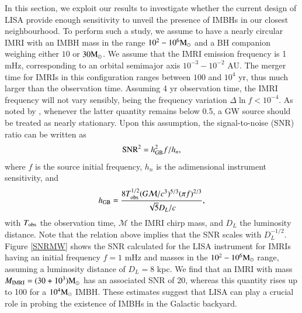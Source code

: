\documentclass[article]{aa}
\newcommand{\Ms}{{\rm M}_\odot}
\newcommand{\imri}{{\rm IMRI}}
\begin{document}
In this section, we exploit our results to investigate whether the current design of LISA provide enough sensitivity to unveil the presence of IMBHs in our closest neighbourhood. 
To perform such a study, we assume to have a nearly circular IMRI with an IMBH mass in the range $10^2-10^6\Ms$ and a BH companion weighing either $10$ or $30\Ms$. 
We assume that the IMRI emission frequency is 1 mHz, corresponding to an orbital semimajor axis $10^{-3}-10^{-2}$ AU. 
The merger time for IMRIs in this configuration ranges between $100$ and $10^4$ yr, thus much larger than the observation time. Assuming 4 yr observation time, the IMRI frequency will not vary sensibly, being the frequency variation $\Delta \ln f < 10^{-4}$. As noted by \cite{robson19}, whenever the latter quantity remains below 0.5, a GW source should be treated as nearly stationary. Upon this assumption, the signal-to-noise (SNR) ratio can be written as
\begin{equation}
    {\rm SNR}^2 = h_{\rm GB}^2 f / h_n,
\end{equation}
where $f$ is the source initial frequency, $h_n$ is the adimensional instrument sensitivity, and 
\begin{equation*}
    h_{\rm GB} = \frac{8T_{\rm obs}^{1/2} (G\mathcal{M}/c^3)^{5/3} (\pi f)^{2/3}}{\sqrt{5}D_L/c},
\end{equation*}
with $T_{\rm obs}$ the observation time, $\mathcal{M}$ the IMRI chirp mass, and $D_L$ the luminosity distance. Note that the relation above implies that the SNR scales with $D_L^{-1/2}$.
Figure \ref{SNRMW} shows the SNR calculated for the LISA instrument for IMRIs having an initial frequency $f=1$ mHz and masses in the $10^2-10^6 \Ms$ range, assuming a luminosity distance of $D_L = 8$ kpc. 
We find that an IMRI with mass $M_\imri = (30 + 10^3)\Ms$ has an associated SNR of 20, whereas this quantity rises up to 100 for a $10^4\Ms$ IMBH. 
These estimates suggest that LISA can play a crucial role in probing the existence of IMBHs in the Galactic backyard. 
\end{document}
